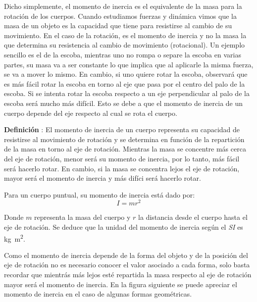 \documentclass[letterpaper]{article}
\newcounter{definiciones}
\newcommand{\defii}{\stepcounter{definiciones} \textbf{Definición \thedefiniciones}: }
\newenvironment{defi}{\begin{framed} \defii}{\end{framed}}
\begin{document}
Dicho simplemente, el momento de inercia es el equivalente de la masa para la rotación de los cuerpos. Cuando estudiamos fuerzas y dinámica vimos que la masa de un objeto es la capacidad que tiene para resistirse al cambio de su movimiento. En el caso de la rotación, es el momento de inercia y no la masa la que determina su resistencia al cambio de movimiento (rotacional). Un ejemplo sencillo es el de la escoba, mientras uno no rompa o separe la escoba en varias partes, su masa va a ser constante lo que implica que al aplicarle la misma fuerza, se va a mover lo mismo. En cambio, si uno quiere rotar la escoba, observará que es más fácil rotar la escoba en torno al eje que pasa por el centro del palo de la escoba. Si se intenta rotar la escoba respecto a un eje perpendicular al palo de la escoba será mucho más difícil. Esto se debe a que el momento de inercia de un cuerpo depende del eje respecto al cual se rota el cuerpo.

\begin{defi}
El momento de inercia de un cuerpo representa su capacidad de resistirse al movimiento de rotación y se determina en función de la repartición de la masa en torno al eje de rotación. Mientras la masa se concentre más cerca del eje de rotación, menor será su momento de inercia, por lo tanto, más fácil será hacerlo rotar. En cambio, si la masa se concentra lejos el eje de rotación, mayor será el momento de inercia y más difíci será hacerlo rotar.

Para un cuerpo puntual, su momento de inercia está dado por:
$$I = mr^2$$

Donde $m$ representa la masa del cuerpo y $r$ la distancia desde el cuerpo hasta el eje de rotación. Se deduce que la unidad del momento de inercia según el \emph{SI} es \si{kg.m^2}.
\end{defi}

Como el momento de inercia depende de la forma del objeto y de la posición del eje de rotación no es necesario conocer el valor asociado a cada forma, solo basta recordar que mientrás más lejos esté repartida la masa respecto al eje de rotación mayor será el momento de inercia. En la figura siguiente se puede apreciar el momento de inercia en el caso de algunas formas geométricas.
\end{document}
